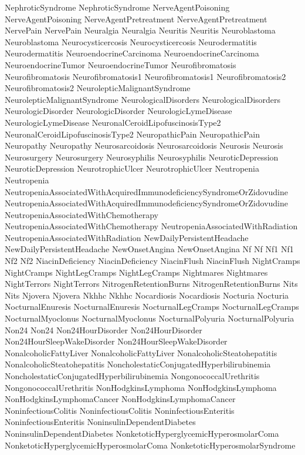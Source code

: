  NephroticSyndrome
 NephroticSyndrome
 NerveAgentPoisoning
 NerveAgentPoisoning
 NerveAgentPretreatment
 NerveAgentPretreatment
 NervePain
 NervePain
 Neuralgia
 Neuralgia
 Neuritis
 Neuritis
 Neuroblastoma
 Neuroblastoma
 Neurocysticercosis
 Neurocysticercosis
 Neurodermatitis
 Neurodermatitis
 NeuroendocrineCarcinoma
 NeuroendocrineCarcinoma
 NeuroendocrineTumor
 NeuroendocrineTumor
 Neurofibromatosis
 Neurofibromatosis
 Neurofibromatosis1
 Neurofibromatosis1
 Neurofibromatosis2
 Neurofibromatosis2
 NeurolepticMalignantSyndrome
 NeurolepticMalignantSyndrome
 NeurologicalDisorders
 NeurologicalDisorders
 NeurologicDisorder
 NeurologicDisorder
 NeurologicLymeDisease
 NeurologicLymeDisease
 NeuronalCeroidLipofuscinosisType2
 NeuronalCeroidLipofuscinosisType2
 NeuropathicPain
 NeuropathicPain
 Neuropathy
 Neuropathy
 Neurosarcoidosis
 Neurosarcoidosis
 Neurosis
 Neurosis
 Neurosurgery
 Neurosurgery
 Neurosyphilis
 Neurosyphilis
 NeuroticDepression
 NeuroticDepression
 NeurotrophicUlcer
 NeurotrophicUlcer
 Neutropenia
 Neutropenia
 NeutropeniaAssociatedWithAcquiredImmunodeficiencySyndromeOrZidovudine
 NeutropeniaAssociatedWithAcquiredImmunodeficiencySyndromeOrZidovudine
 NeutropeniaAssociatedWithChemotherapy
 NeutropeniaAssociatedWithChemotherapy
 NeutropeniaAssociatedWithRadiation
 NeutropeniaAssociatedWithRadiation
 NewDailyPersistentHeadache
 NewDailyPersistentHeadache
 NewOnsetAngina
 NewOnsetAngina
 Nf
 Nf
 Nf1
 Nf1
 Nf2
 Nf2
 NiacinDeficiency
 NiacinDeficiency
 NiacinFlush
 NiacinFlush
 NightCramps
 NightCramps
 NightLegCramps
 NightLegCramps
 Nightmares
 Nightmares
 NightTerrors
 NightTerrors
 NitrogenRetentionBurns
 NitrogenRetentionBurns
 Nits
 Nits
 Njovera
 Njovera
 Nkhhc
 Nkhhc
 Nocardiosis
 Nocardiosis
 Nocturia
 Nocturia
 NocturnalEnuresis
 NocturnalEnuresis
 NocturnalLegCramps
 NocturnalLegCramps
 NocturnalMyoclonus
 NocturnalMyoclonus
 NocturnalPolyuria
 NocturnalPolyuria
 Non24
 Non24
 Non24HourDisorder
 Non24HourDisorder
 Non24HourSleepWakeDisorder
 Non24HourSleepWakeDisorder
 NonalcoholicFattyLiver
 NonalcoholicFattyLiver
 NonalcoholicSteatohepatitis
 NonalcoholicSteatohepatitis
 NoncholestaticConjugatedHyperbilirubinemia
 NoncholestaticConjugatedHyperbilirubinemia
 NongonococcalUrethritis
 NongonococcalUrethritis
 NonHodgkinsLymphoma
 NonHodgkinsLymphoma
 NonHodgkinsLymphomaCancer
 NonHodgkinsLymphomaCancer
 NoninfectiousColitis
 NoninfectiousColitis
 NoninfectiousEnteritis
 NoninfectiousEnteritis
 NoninsulinDependentDiabetes
 NoninsulinDependentDiabetes
 NonketoticHyperglycemicHyperosmolarComa
 NonketoticHyperglycemicHyperosmolarComa
 NonketoticHyperosmolarSyndrome
